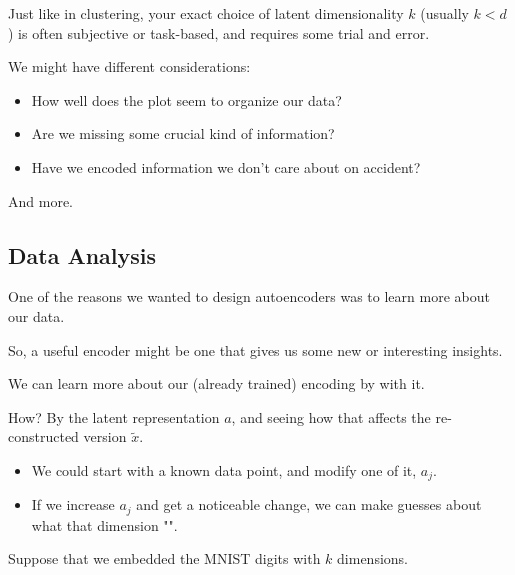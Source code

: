            \subsecdiv

            Just like in clustering, your exact choice of latent dimensionality $k$ (usually $k < d$) is often subjective or task-based, and requires some trial and error.

            We might have different considerations:

            \begin{itemize}
                \item How well does the plot seem to organize our data?
                \item Are we missing some crucial kind of information?
                \item Have we encoded information we don't care about on accident?
            \end{itemize}

            And more.

    \subsection{Data Analysis}

        One of the reasons we wanted to design autoencoders was to learn more about our data.

        So, a useful encoder might be one that gives us some new or interesting insights.\\

        \begin{concept}
            We can learn more about our (already trained) encoding by  with it.

            How? By  the latent representation $a$, and seeing how that affects the re-constructed version $\tilde{x}$.

            

            \begin{itemize}
                \item We could start with a known data point, and modify one  of it, $a_j$. 
                \item If we increase $a_j$ and get a noticeable change, we can make guesses about what that dimension "".
            \end{itemize}
        \end{concept}

        \miniex Suppose that we embedded the MNIST digits with $k$ dimensions.

